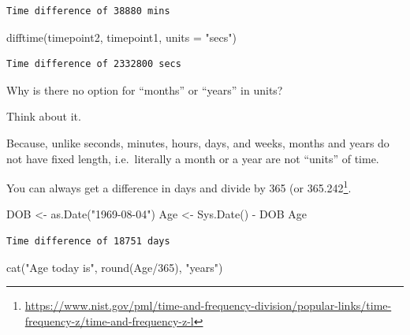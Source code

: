 \documentclass[
]{book}
\newenvironment{Shaded}{\begin{snugshade}}{\end{snugshade}}
\newcommand{\AttributeTok}[1]{\textcolor[rgb]{0.77,0.63,0.00}{#1}}
\newcommand{\DecValTok}[1]{\textcolor[rgb]{0.00,0.00,0.81}{#1}}
\newcommand{\FunctionTok}[1]{\textcolor[rgb]{0.00,0.00,0.00}{#1}}
\newcommand{\NormalTok}[1]{#1}
\newcommand{\OtherTok}[1]{\textcolor[rgb]{0.56,0.35,0.01}{#1}}
\newcommand{\SpecialCharTok}[1]{\textcolor[rgb]{0.00,0.00,0.00}{#1}}
\newcommand{\StringTok}[1]{\textcolor[rgb]{0.31,0.60,0.02}{#1}}
\DeclareRobustCommand{\href}[2]{#2\footnote{\url{#1}}}
\begin{document}
\begin{verbatim}
Time difference of 38880 mins
\end{verbatim}

\begin{Shaded}
\begin{Highlighting}[]
\FunctionTok{difftime}\NormalTok{(timepoint2, timepoint1, }\AttributeTok{units =} \StringTok{"secs"}\NormalTok{)}
\end{Highlighting}
\end{Shaded}

\begin{verbatim}
Time difference of 2332800 secs
\end{verbatim}

\begin{warning}
Why is there no option for ``months'' or ``years'' in units?

Think about it.

Because, unlike seconds, minutes, hours, days, and weeks, months and
years do not have fixed length, i.e.~literally a month or a year are not
``units'' of time.

You can always get a difference in days and divide by 365 (or
\href{https://www.nist.gov/pml/time-and-frequency-division/popular-links/time-frequency-z/time-and-frequency-z-l}{365.242}.
\end{warning}

\begin{Shaded}
\begin{Highlighting}[]
\NormalTok{DOB }\OtherTok{\textless{}{-}} \FunctionTok{as.Date}\NormalTok{(}\StringTok{"1969{-}08{-}04"}\NormalTok{)}
\NormalTok{Age }\OtherTok{\textless{}{-}} \FunctionTok{Sys.Date}\NormalTok{() }\SpecialCharTok{{-}}\NormalTok{ DOB}
\NormalTok{Age}
\end{Highlighting}
\end{Shaded}

\begin{verbatim}
Time difference of 18751 days
\end{verbatim}

\begin{Shaded}
\begin{Highlighting}[]
\FunctionTok{cat}\NormalTok{(}\StringTok{"Age today is"}\NormalTok{, }\FunctionTok{round}\NormalTok{(Age}\SpecialCharTok{/}\DecValTok{365}\NormalTok{), }\StringTok{"years"}\NormalTok{)}
\end{Highlighting}
\end{Shaded}
\end{document}

